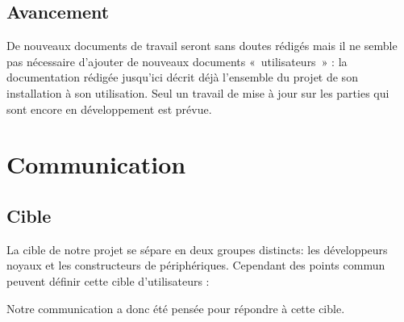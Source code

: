 \documentclass[francais]{rtxreport}
\begin{document}
\section{Avancement}

De nouveaux documents de travail seront sans doutes rédigés mais il ne semble
pas nécessaire d'ajouter de nouveaux documents «~utilisateurs~» : la
documentation rédigée jusqu'ici décrit déjà l'ensemble du projet de son
installation à son utilisation. Seul un travail de mise à jour sur les parties
qui sont encore en développement est prévue.

\chapter{Communication}




\section{Cible}

La cible de notre projet se sépare en deux groupes distincts: les développeurs
noyaux et les constructeurs de périphériques. Cependant des points commun
peuvent définir cette cible d'utilisateurs :




Notre communication a donc été pensée pour répondre à cette cible.
\end{document}

